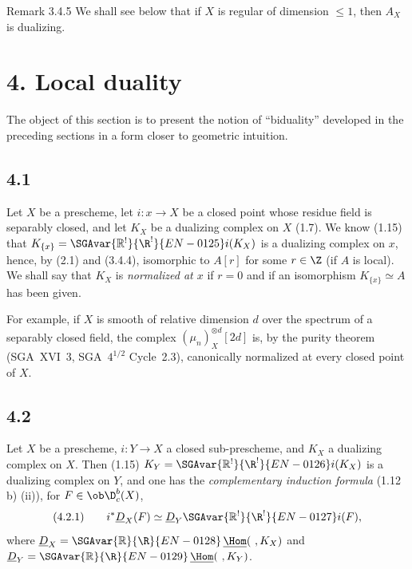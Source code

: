 \begin{statement}{Remark 3.4.5}
We shall see below that if $X$ is regular of dimension $\le1$, then $A_X$ is dualizing.
\end{statement}

\section*{4. Local duality}

The object of this section is to present the notion of ``biduality'' developed in the preceding sections in a form closer to geometric intuition.

\subsection*{4.1}
Let $X$ be a prescheme, let $i:x\to X$ be a closed point whose residue field is separably closed, and let $K_X$ be a dualizing complex on $X$ (1.7). We know (1.15) that $K_{\{x\}}=\SGAvar{\mathbb{R}^{!}}{\R^{!}}{EN-0125}i(K_X)$ is a dualizing complex on $x$, hence, by (2.1) and (3.4.4), isomorphic to $A[r]$ for some $r\in\Z$ (if $A$ is local). We shall say that $K_X$ is \emph{normalized at $x$} if $r=0$ and if an isomorphism $K_{\{x\}}\simeq A$ has been given.

For example, if $X$ is smooth of relative dimension $d$ over the spectrum of a separably closed field, the complex $(\mu_n)_X^{\otimes d}[2d]$ is, by the purity theorem (SGA~XVI~3, SGA~$4^{1/2}$ Cycle~2.3), canonically normalized at every closed point of $X$.

\subsection*{4.2}
Let $X$ be a prescheme, $i:Y\to X$ a closed sub-prescheme, and $K_X$ a dualizing complex on $X$. Then (1.15) $K_Y=\SGAvar{\mathbb{R}^{!}}{\R^{!}}{EN-0126}i(K_X)$ is a dualizing complex on $Y$, and one has the \emph{complementary induction formula} (1.12 b) (ii)), for $F\in \ob\D_c^b(X)$,
\[
(4.2.1)\qquad i^*\underline{D}_X(F)\simeq\underline{D}_Y\SGAvar{\mathbb{R}^{!}}{\R^{!}}{EN-0127}i(F),
\]
where $\underline{D}_X=\SGAvar{\mathbb{R}}{\R}{EN-0128}\,\underline{\Hom}(\ ,K_X)$ and $\underline{D}_Y=\SGAvar{\mathbb{R}}{\R}{EN-0129}\,\underline{\Hom}(\ ,K_Y)$.

